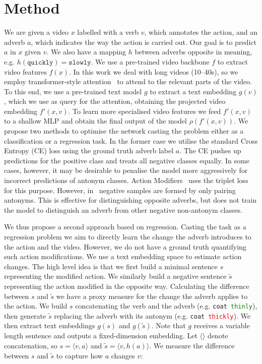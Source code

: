 \documentclass[10pt,twocolumn,letterpaper]{article}
\begin{document}
\vspace{-3pt}
\section{Method}
\label{sec:method}
\vspace{-2pt}

We are given a video $x$ labelled with a verb $v$, which annotates the action, and an adverb $a$, which indicates the way the action is carried out. Our goal is to predict $a$ in $x$ given $v$. We also have 
a mapping $h$ between adverbs opposite in meaning, e.g. $h(\texttt{quickly}) = \texttt{slowly}$.  We use a pre-trained video backbone $f$ to extract video features $f(x)$. In this work we deal with long videos (10--40s), so we employ transformer-style attention~\cite{vaswani2017attention} to attend to the relevant parts of the video. To this end, we use a pre-trained text model $g$ to extract a text embedding $g(v)$, which we use as query for the attention, obtaining the projected video embedding $f'(x, v)$. To learn more specialised video features we feed $f'(x, v)$ to a shallow MLP and 
obtain the final output of the model $\rho(f'(x, v))$.
We propose two methods to optimise the network casting the problem either as a classification or a regression task. In the former case we utilise the standard Cross Entropy (CE) loss using the ground truth adverb label $a$. 
The CE 
pushes up predictions for the 
positive class and treats all negative classes equally. In some cases, however, it may be desirable 
to penalise the model more aggressively for incorrect predictions of antonym classes. 
Action Modifiers~\cite{doughty2020action} uses the triplet loss for this purpose. However, in~\cite{doughty2020action} negative samples are formed by only pairing antonyms. This is effective for distinguishing opposite adverbs, but does not train the model to distinguish an adverb from other negative non-antonym classes.

\vspace{15pt}

We thus propose a second approach based on regression. 
Casting the task as a regression problem we aim to directly learn the change the adverb introduces to the action and the video. However, 
we do not have a ground truth quantifying such action modifications. 
We use a text embedding space to estimate action 
changes. The high level idea is that we first build a minimal sentence $s$ representing the modified action. We similarly build a negative sentence $\tilde{s}$ representing the action modified in the opposite way.
Calculating the difference between $s$ and $\tilde{s}$ we have a proxy measure for the change the adverb applies to the action. We build $s$ concatenating the verb and the adverb (e.g. \texttt{coat \textcolor{Green}{thinly}}), then generate $\tilde{s}$ replacing the 
adverb with its antonym (e.g. \texttt{coat \textcolor{red}{thickly}}). 
We then extract text embeddings $g(s)$ and $g(\tilde{s})$. 
Note that $g$ receives a variable length sentence and outputs a fixed-dimension embedding. 
Let $\langle \rangle$ denote concatenation, so $s = \langle v, a \rangle$ and $\tilde{s} = \langle v, h(a) \rangle$. We 
measure the difference between $s$ and $\tilde{s}$ to capture how $a$ changes $v$:
\end{document}
